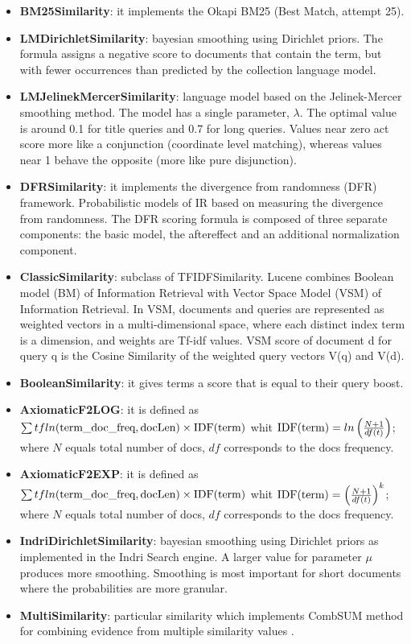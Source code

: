 \begin{itemize}
    \item \textbf{BM25Similarity}: it implements the Okapi BM25 (Best Match, attempt 25).
    \item \textbf{LMDirichletSimilarity}: bayesian smoothing using Dirichlet priors. The formula assigns a negative score to documents that contain the term, but with fewer occurrences than predicted by the collection language model.
    \item \textbf{LMJelinekMercerSimilarity}: language model based on the Jelinek-Mercer smoothing method. The model has a single parameter, $\lambda$. The optimal value is around 0.1 for title queries and 0.7 for long queries. Values near zero act score more like a conjunction (coordinate level matching), whereas values near 1 behave the opposite (more like pure disjunction).
    \item \textbf{DFRSimilarity}: it implements the divergence from randomness (DFR) framework. Probabilistic models of IR based on measuring the divergence from randomness. The DFR scoring formula is composed of three separate components: the basic model, the aftereffect and an additional normalization component.
    \item \textbf{ClassicSimilarity}: subclass of TFIDFSimilarity. Lucene combines Boolean model (BM) of Information Retrieval with Vector Space Model (VSM) of Information Retrieval. In VSM, documents and queries are represented as weighted vectors in a multi-dimensional space, where each distinct index term is a dimension, and weights are Tf-idf values. VSM score of document d for query q is the Cosine Similarity of the weighted query vectors V(q) and V(d).
    \item \textbf{BooleanSimilarity}: it gives terms a score that is equal to their query boost.
    \item \textbf{AxiomaticF2LOG}: it is defined as $ \sum tfln(\textup{term\_doc\_freq}, \textup{docLen}) \times \textup{IDF(term)}$ whit $\textup{IDF(term)}=ln \left(\frac{N+1}{df(t)}\right)$; where $N$ equals total number of docs, $df$ corresponds to the docs frequency.
    \item \textbf{AxiomaticF2EXP}: it is defined as $ \sum tfln(\textup{term\_doc\_freq}, \textup{docLen}) \times \textup{IDF(term)}$ whit $\textup{IDF(term)}= \left({\frac{N+1}{df(t)}}\right)^k$; where $N$ equals total number of docs, $df$ corresponds to the docs frequency.
    \item \textbf{IndriDirichletSimilarity}: bayesian smoothing using Dirichlet priors as implemented in the Indri Search engine. A larger value for parameter $\mu$ produces more smoothing. Smoothing is most important for short documents where the probabilities are more granular.
    \item \textbf{MultiSimilarity}: particular similarity which implements CombSUM method for combining evidence from multiple similarity values \cite{multisim}.
\end{itemize}
